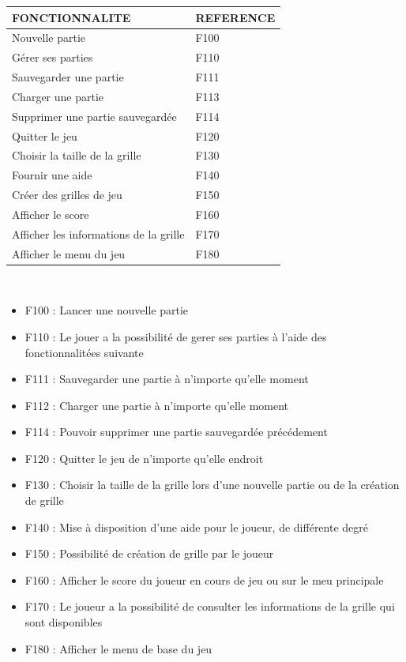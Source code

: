 \documentclass[11pt]{article}
\begin{document}
\vspace{0,5cm}
\small
\begin{tabular}{|p{10cm}|p{3cm}|}
	\hline
	\textbf{FONCTIONNALITE} & \textbf{REFERENCE}\\
	\hline
	\hline
		Nouvelle partie 											& F100 \\	\cline{1-2}
		Gérer ses parties											& F110 \\	\cline{1-2}	
		Sauvegarder une partie 										& F111 \\	\cline{1-2}	
		Charger une partie 											& F113 \\	\cline{1-2}	
		Supprimer une partie sauvegardée							& F114 \\	\cline{1-2}	
		Quitter le jeu												& F120 \\	\cline{1-2}	
		Choisir la taille de la grille								& F130 \\	\cline{1-2}
		Fournir une aide 											& F140 \\	\cline{1-2}
		Créer des grilles de jeu									& F150 \\	\cline{1-2}
		Afficher le score											& F160 \\	\cline{1-2}
		Afficher les informations de la grille						& F170 \\	\cline{1-2}
		Afficher le menu du jeu 									& F180 \\	\cline{1-2}
	\hline
	\end{tabular}
\normalsize \\

\begin{itemize}
	\item F100 : Lancer une nouvelle partie
	\item F110 : Le jouer a la possibilité de gerer ses parties à l'aide des fonctionnalitées suivante
	\item F111 : Sauvegarder une partie à n'importe qu'elle moment
	\item F112 : Charger une partie à n'importe qu'elle moment
	\item F114 : Pouvoir supprimer une partie sauvegardée précédement
	\item F120 : Quitter le jeu de n'importe qu'elle endroit
	\item F130 : Choisir la taille de la grille lors d'une nouvelle partie ou de la création de grille
	\item F140 : Mise à disposition d'une aide pour le joueur, de différente degré
	\item F150 : Possibilité de création de grille par le joueur
	\item F160 : Afficher le score du joueur en cours de jeu ou sur le meu principale
	\item F170 : Le joueur a la possibilité de consulter les informations de la grille qui sont disponibles
	\item F180 : Afficher le menu de base du jeu
\end{itemize}
\end{document}
